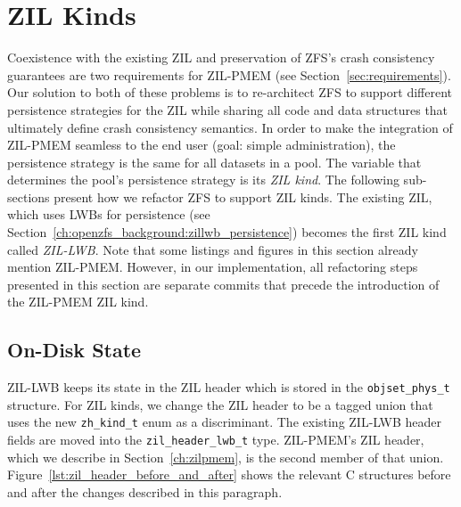 \documentclass[12pt,a4paper,twoside]{book}
\begin{document}
\section{ZIL Kinds}\label{ch:zilkinds}
Coexistence with the existing ZIL and preservation of ZFS's crash consistency guarantees are two requirements for ZIL-PMEM (see Section~\ref{sec:requirements}).
Our solution to both of these problems is to re-architect ZFS to support different persistence strategies for the ZIL while sharing all code and data structures that ultimately define crash consistency semantics.
In order to make the integration of ZIL-PMEM seamless to the end user (goal: simple administration), the persistence strategy is the same for all datasets in a pool.
The variable that determines the pool's persistence strategy is its \textit{ZIL kind}.
The following sub-sections present how we refactor ZFS to support ZIL kinds.
The existing ZIL, which uses LWBs for persistence (see Section~\ref{ch:openzfs_background:zillwb_persistence}) becomes the first ZIL kind called \textit{ZIL-LWB}.
Note that some listings and figures in this section already mention ZIL-PMEM.
However, in our implementation, all refactoring steps presented in this section are separate commits that precede the introduction of the ZIL-PMEM ZIL kind.

\subsection{On-Disk State}\label{sec:di:zil_header}
ZIL-LWB keeps its state in the ZIL header which is stored in the \lstinline{objset_phys_t} structure.
For ZIL kinds, we change the ZIL header to be a tagged union that uses the new \lstinline{zh_kind_t} enum as a discriminant.
The existing ZIL-LWB header fields are moved into the \lstinline{zil_header_lwb_t} type.
ZIL-PMEM's ZIL header, which we describe in Section~\ref{ch:zilpmem}, is the second member of that union.
Figure~\ref{lst:zil_header_before_and_after} shows the relevant C structures before and after the changes described in this paragraph.
\end{document}
